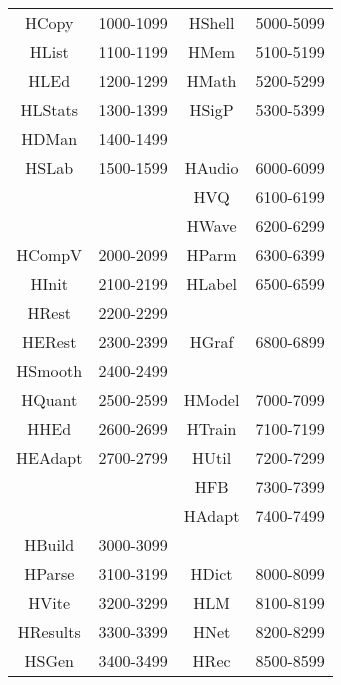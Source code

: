 \begin{itemize}
\begin{center}
\begin{tabular}{|c|c|c|c|}
\hline
HCopy    & 1000-1099     & HShell        & 5000-5099    \\
HList    & 1100-1199     & HMem          & 5100-5199    \\
HLEd     & 1200-1299     & HMath         & 5200-5299    \\
HLStats  & 1300-1399     & HSigP         & 5300-5399    \\
HDMan    & 1400-1499     &               &              \\
HSLab    & 1500-1599     & HAudio        & 6000-6099    \\
         &               & HVQ           & 6100-6199    \\
         &               & HWave         & 6200-6299    \\
HCompV   & 2000-2099     & HParm         & 6300-6399    \\
HInit    & 2100-2199     & HLabel        & 6500-6599    \\
HRest    & 2200-2299     &               &              \\
HERest   & 2300-2399     & HGraf         & 6800-6899    \\
HSmooth  & 2400-2499     &               &              \\
HQuant   & 2500-2599     & HModel        & 7000-7099    \\
HHEd     & 2600-2699     & HTrain        & 7100-7199    \\
HEAdapt  & 2700-2799     & HUtil         & 7200-7299    \\
         &               & HFB           & 7300-7399    \\
         &               & HAdapt        & 7400-7499    \\
HBuild   & 3000-3099     &               &              \\
HParse   & 3100-3199     & HDict         & 8000-8099    \\
HVite    & 3200-3299     & HLM           & 8100-8199    \\
HResults & 3300-3399     & HNet          & 8200-8299    \\
HSGen    & 3400-3499     & HRec          & 8500-8599    \\
\hline
\end{tabular}
\end{center}


\end{itemize}
